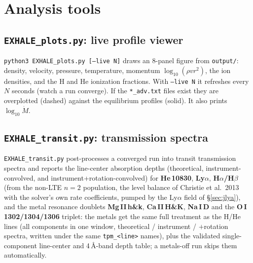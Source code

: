 \documentclass[english,a4paper]{my_memo}
\begin{document}
\section{Analysis tools}

\subsection{\texttt{EXHALE\_plots.py}: live profile viewer}
\texttt{python3 EXHALE\_plots.py [--live N]} draws an 8-panel figure from
\texttt{output/}: density, velocity, pressure, temperature, momentum
$\log_{10}(\rho v r^2)$, the ion densities, and the H and He ionization
fractions. With \texttt{--live N} it refreshes every $N$ seconds (watch a run
converge). If the \texttt{*\_adv.txt} files exist they are overplotted (dashed)
against the equilibrium profiles (solid). It also prints $\log_{10}\dot M$.

\subsection{\texttt{EXHALE\_transit.py}: transmission spectra}\label{sec:tpm}
\texttt{EXHALE\_transit.py} post-processes a converged run into transit
transmission spectra and reports the line-center
absorption depths (theoretical, instrument-convolved, and
instrument+rotation-convolved) for \textbf{He\,10830}, \textbf{Ly$\alpha$},
\textbf{H$\alpha$/H$\beta$} (from the non-LTE $n{=}2$ population, the level
balance of Christie et al.\ 2013 with the solver's own rate coefficients,
pumped by the Ly$\alpha$ field of \S\ref{sec:jlya}),
and the metal resonance doublets \textbf{Mg\,II\,h\&k}, \textbf{Ca\,II\,H\&K},
\textbf{Na\,I\,D} and the \textbf{O\,I\,1302/1304/1306} triplet: the metals
get the same full treatment as the H/He
lines (all components in one window, theoretical / instrument /
$+$rotation spectra, written under the same \texttt{tpm\_<line>} names), plus
the validated single-component line-center and 4\,\AA-band depth table; a
metals-off run skips them automatically.
\end{document}
